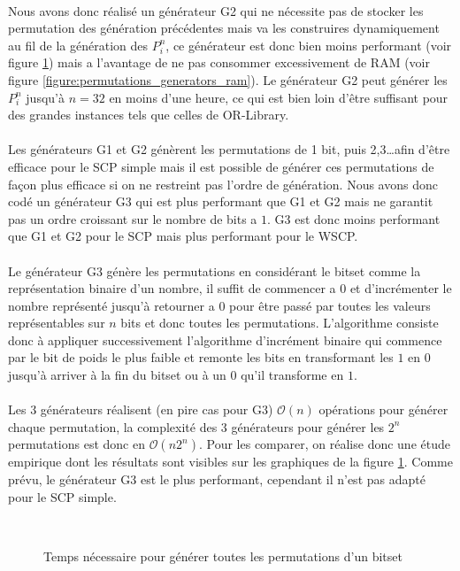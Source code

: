 \documentclass[12pt,letterpaper,twoside]{article}
\begin{document}
			\paragraph*{}
				Nous avons donc réalisé un générateur G2 qui ne nécessite pas de stocker les permutation des génération précédentes mais va les construires dynamiquement au fil de la génération des \(P_i^n\), ce générateur est donc bien moins performant (voir figure \ref{figure:plots/permutations_generators_time}) mais a l'avantage de ne pas consommer excessivement de RAM (voir figure \ref{figure:permutations_generators_ram}). Le générateur G2 peut générer les \(P_i^n\) jusqu'à \(n = 32\) en moins d'une heure, ce qui est bien loin d’être suffisant pour des grandes instances tels que celles de OR-Library.
			\paragraph*{}
				Les générateurs G1 et G2 génèrent les permutations de 1 bit, puis 2,3\ldots afin d’être efficace pour le SCP simple mais il est possible de générer ces permutations de façon plus efficace si on ne restreint pas l'ordre de génération. Nous avons donc codé un générateur G3 qui est plus performant que G1 et G2 mais ne garantit pas un ordre croissant sur le nombre de bits a \(1\). G3 est donc moins performant que G1 et G2 pour le SCP mais plus performant pour le WSCP.
			\paragraph*{}
				Le générateur G3 génère les permutations en considérant le bitset comme la représentation binaire d'un nombre, il suffit de commencer a 0 et d'incrémenter le nombre représenté jusqu'à retourner a 0 pour être passé par toutes les valeurs représentables sur \(n\) bits et donc toutes les permutations. L'algorithme consiste donc à appliquer successivement l'algorithme d'incrément binaire qui commence par le bit de poids le plus faible et remonte les bits en transformant les \(1\) en \(0\) jusqu’à arriver à la fin du bitset ou à un \(0\) qu'il transforme en \(1\).
			\paragraph*{}
				Les 3 générateurs réalisent (en pire cas pour G3) \(\mathcal{O}(n)\) opérations pour générer chaque permutation, la complexité des 3 générateurs pour générer les \(2^n\) permutations est donc en \(\mathcal{O}(n2^n)\). Pour les comparer, on réalise donc une étude empirique dont les résultats sont visibles sur les graphiques de la figure \ref{figure:plots/permutations_generators_time}. Comme prévu, le générateur G3 est le plus performant, cependant il n'est pas adapté pour le SCP simple.
			\begin{figure}[H]
				\centering
				\\
				\caption{Temps nécessaire pour générer toutes les permutations d'un bitset}
				\label{figure:plots/permutations_generators_time}
			\end{figure}
\end{document}
